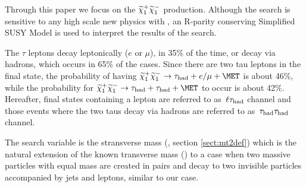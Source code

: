 Through this paper we focus on the $\widetilde{\chi}_{1}^{+}\widetilde{\chi}_{1}^{-}$ production. 
Although the search is sensitive to any high scale 
new physics with \MET, an R-parity conserving Simplified SUSY Model \cite{Alwall:2008ag,alves:sms} is used 
to interpret the results of the search.

The $\tau$ leptons decay leptonically ($e$ or $\mu$), in 35\% of the time, or decay via hadrons, which occurs in 65\% of the cases. Since there are two tau leptons in the final state, the probability of having $\PSGcpDo\PSGcmDo \rightarrow \hadtau+e/\mu+\MET$ is about 46\%, while the probability for $\PSGcpDo\PSGcmDo \rightarrow \hadtau+\hadtau+\MET$ to occur is about 42\%. Hereafter, final states containing a lepton are referred to as $\,\ell\tau_{\rm had}$ channel and those events where the two taus decay via hadrons are referred to as $\,\tau_{\rm had}\tau_{\rm had}$ channel. 

The search variable is the stransverse mass (\mttwo, section \ref{sect:mt2def}) 
which is the natural extension of the known transverse mass (\mt) to a case 
when two massive particles with equal mass are created in pairs and decay 
to two invisible particles accompanied by jets and leptons, similar to our case.

